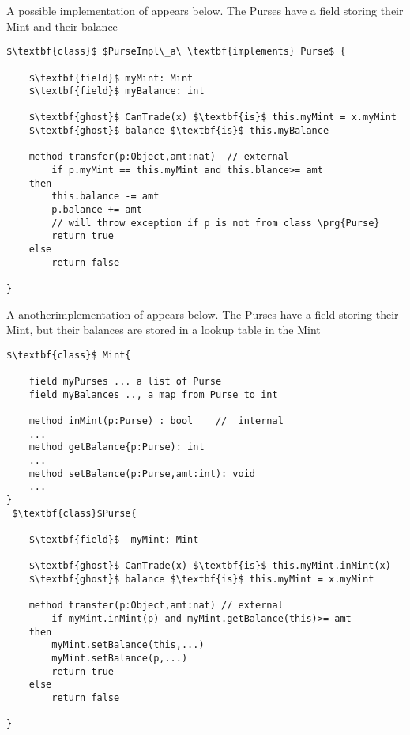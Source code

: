  
A possible implementation of  appears below. The Purses have a field storing their Mint and their balance

\begin{lstlisting}[mathescape=true, language=Chainmail, frame=lines]
$\textbf{class}$ $PurseImpl\_a\ \textbf{implements} Purse$ {
    
    $\textbf{field}$ myMint: Mint
    $\textbf{field}$ myBalance: int
     
    $\textbf{ghost}$ CanTrade(x) $\textbf{is}$ this.myMint = x.myMint
    $\textbf{ghost}$ balance $\textbf{is}$ this.myBalance
    
    method transfer(p:Object,amt:nat)  // external
    	if p.myMint == this.myMint and this.blance>= amt 
	then
		this.balance -= amt
		p.balance += amt
		// will throw exception if p is not from class \prg{Purse}
		return true
	else
		return false	
  
}
\end{lstlisting}

A anotherimplementation of  appears below. The Purses have a field storing their Mint, but their balances are stored in a 
lookup table in the Mint

\begin{lstlisting}[mathescape=true, language=Chainmail, frame=lines]
 $\textbf{class}$ Mint{

	field myPurses ... a list of Purse
	field myBalances .., a map from Purse to int
	
	method inMint(p:Purse) : bool    //  internal
	...	
	method getBalance{p:Purse): int
	...
	method setBalance(p:Purse,amt:int): void
	...	
}
 $\textbf{class}$Purse{
    
    $\textbf{field}$  myMint: Mint
     
    $\textbf{ghost}$ CanTrade(x) $\textbf{is}$ this.myMint.inMint(x)
    $\textbf{ghost}$ balance $\textbf{is}$ this.myMint = x.myMint
    
    method transfer(p:Object,amt:nat) // external 
    	if myMint.inMint(p) and myMint.getBalance(this)>= amt 
	then
		myMint.setBalance(this,...)
		myMint.setBalance(p,...)
		return true
	else
		return false	
  
}
\end{lstlisting}



